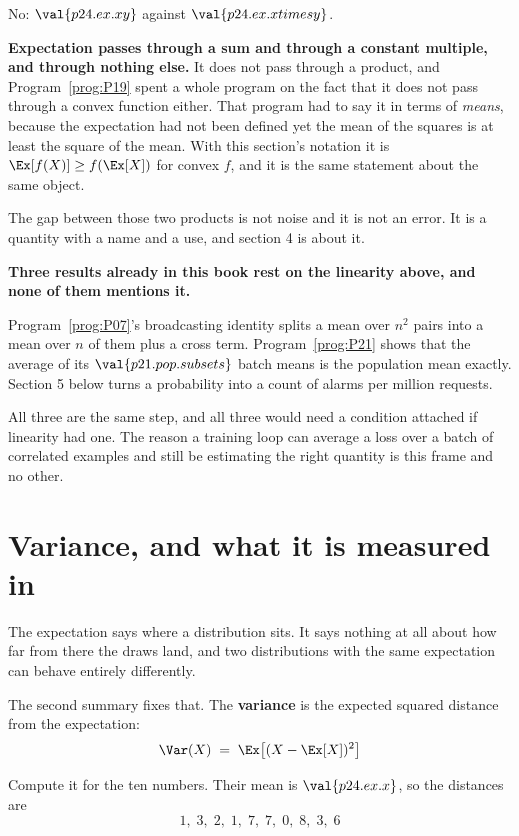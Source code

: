 \begin{fr}
\begin{ansblock}
No: $\val{p24.ex.xy}$ against $\val{p24.ex.xtimesy}$.
\end{ansblock}

\textbf{Expectation passes through a sum and through a constant multiple, and
through nothing else.} It does not pass through a product, and
Program~\ref{prog:P19} spent a whole program on the fact that it does not pass
through a convex function either. That program had to say it in terms of
\emph{means}, because the expectation had not been defined yet \dash{} the
mean of the squares is at least the square of the mean. With this section's
notation it is $\Ex[f(X)] \ge f(\Ex[X])$ for convex $f$, and it is the same
statement about the same object.

The gap between those two products is not noise and it is not an error. It is
a quantity with a name and a use, and section 4 is about it.
\end{fr}

\begin{fr}
\begin{aibox}
\textbf{Three results already in this book rest on the linearity above, and
none of them mentions it.}

Program~\ref{prog:P07}'s broadcasting identity splits a mean over $n^{2}$
pairs into a mean over $n$ of them plus a cross term. Program~\ref{prog:P21}
shows that the average of its $\val{p21.pop.subsets}$ batch means is the
population mean exactly. Section 5 below turns a probability into a
count of alarms per million requests.

All three are the same step, and all three would need a condition attached if
linearity had one. The reason a training loop can average a loss over a batch
of correlated examples and still be estimating the right quantity is this
frame and no other.
\end{aibox}
\end{fr}

\section{Variance, and what it is measured in}
\label{sec:P24-variance}

\begin{fr}
The expectation says where a distribution sits. It says nothing at all about
how far from there the draws land, and two distributions with the same
expectation can behave entirely differently.

The second summary fixes that. The \textbf{variance} is the expected squared
distance from the expectation:
\[ \Var(X) \;=\; \Ex\bigl[(X - \Ex[X])^{2}\bigr] \]

Compute it for the ten numbers. Their mean is $\val{p24.ex.x}$, so the
distances are
\[ 1,\; 3,\; 2,\; 1,\; 7,\; 7,\; 0,\; 8,\; 3,\; 6 \]
\dotline
\nextframe
\end{fr}

